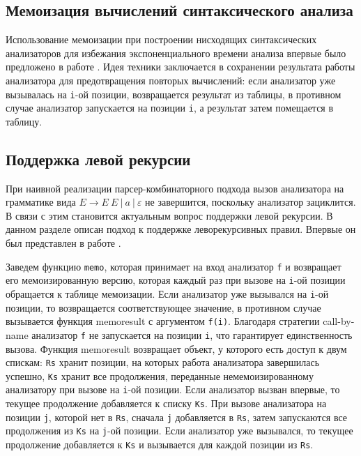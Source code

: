     \subsection{Мемоизация вычислений синтаксического анализа}
    Использование мемоизации при построении нисходящих синтаксических анализаторов для избежания экспоненциального времени анализа впервые было предложено в работе \cite{norvig1991techniques}. Идея техники заключается в сохранении результата работы анализатора для предотвращения повторых вычислений: если анализатор уже вызывалась на {\tt i}-ой позиции, возвращается результат из таблицы, в противном случае анализатор запускается на позиции {\tt i}, а результат затем помещается в таблицу. 
    
    \subsection{Поддержка левой рекурсии}

При наивной реализации парсер-комбинаторного подхода вызов анализатора на грамматике вида ${E \rightarrow E \ E \ | \ a \ | \ \varepsilon}$ не завершится, поскольку анализатор зациклится. В связи с этим становится актуальным вопрос поддержки левой рекурсии. В данном разделе описан подход к поддержке леворекурсивных правил. Впервые он был представлен в работе \cite{johnson1995memoization}. 

Заведем функцию {\tt memo}, которая принимает на вход анализатор {\tt f} и возвращает его мемоизированную версию, которая каждый раз при вызове на {\tt i}-ой позиции обращается к таблице мемоизации. Если анализатор уже вызывался на {\tt i}-ой позиции, то возвращается соответствующее значение, в противном случае вызывается функция memoresult с аргументом {\tt f(i)}. Благодаря стратегии call-by-name анализатор {\tt f} не запускается на позиции {\tt i}, что гарантирует единственность вызова. Функция memoresult возвращает объект, у которого есть доступ к двум спискам: {\tt Rs} хранит позиции, на которых работа анализатора завершилась успешно, {\tt Ks} хранит все продолжения, переданные немемоизированному анализатору при вызове на {\tt i}-ой позиции. Если анализатор вызван впервые, то текущее продолжение добавляется к списку {\tt Ks}. При вызове анализатора на позиции {\tt j}, которой нет в {\tt Rs}, сначала {\tt j} добавляется  в {\tt Rs}, затем запускаются все продолжения из {\tt Ks} на {\tt j}-ой позиции. Если анализатор уже вызывался, то текущее продолжение добавляется к {\tt Ks} и вызывается для каждой позиции из {\tt Rs}.

